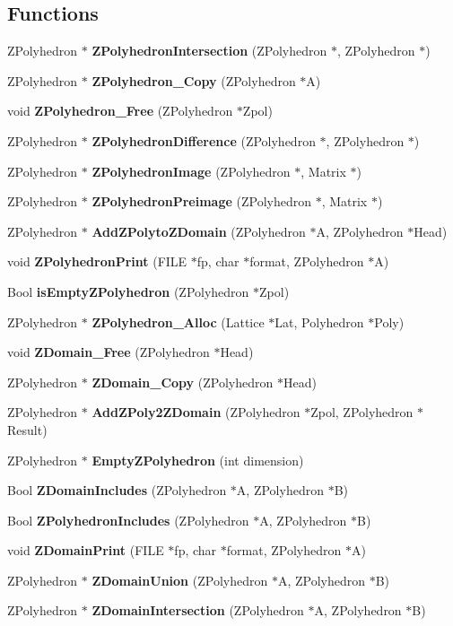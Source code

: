 \subsection*{Functions}
\begin{CompactItemize}
\item 
ZPolyhedron $\ast$ {\bf ZPolyhedron\-Intersection} (ZPolyhedron $\ast$, ZPolyhedron $\ast$)
\item 
ZPolyhedron $\ast$ {\bf ZPolyhedron\_\-Copy} (ZPolyhedron $\ast$A)
\item 
void {\bf ZPolyhedron\_\-Free} (ZPolyhedron $\ast$Zpol)
\item 
ZPolyhedron $\ast$ {\bf ZPolyhedron\-Difference} (ZPolyhedron $\ast$, ZPolyhedron $\ast$)
\item 
ZPolyhedron $\ast$ {\bf ZPolyhedron\-Image} (ZPolyhedron $\ast$, Matrix $\ast$)
\item 
ZPolyhedron $\ast$ {\bf ZPolyhedron\-Preimage} (ZPolyhedron $\ast$, Matrix $\ast$)
\item 
ZPolyhedron $\ast$ {\bf Add\-ZPolyto\-ZDomain} (ZPolyhedron $\ast$A, ZPolyhedron $\ast$Head)
\item 
void {\bf ZPolyhedron\-Print} (FILE $\ast$fp, char $\ast$format, ZPolyhedron $\ast$A)
\item 
Bool {\bf is\-Empty\-ZPolyhedron} (ZPolyhedron $\ast$Zpol)
\item 
ZPolyhedron $\ast$ {\bf ZPolyhedron\_\-Alloc} (Lattice $\ast$Lat, Polyhedron $\ast$Poly)
\item 
void {\bf ZDomain\_\-Free} (ZPolyhedron $\ast$Head)
\item 
ZPolyhedron $\ast$ {\bf ZDomain\_\-Copy} (ZPolyhedron $\ast$Head)
\item 
ZPolyhedron $\ast$ {\bf Add\-ZPoly2ZDomain} (ZPolyhedron $\ast$Zpol, ZPolyhedron $\ast$Result)
\item 
ZPolyhedron $\ast$ {\bf Empty\-ZPolyhedron} (int dimension)
\item 
Bool {\bf ZDomain\-Includes} (ZPolyhedron $\ast$A, ZPolyhedron $\ast$B)
\item 
Bool {\bf ZPolyhedron\-Includes} (ZPolyhedron $\ast$A, ZPolyhedron $\ast$B)
\item 
void {\bf ZDomain\-Print} (FILE $\ast$fp, char $\ast$format, ZPolyhedron $\ast$A)
\item 
ZPolyhedron $\ast$ {\bf ZDomain\-Union} (ZPolyhedron $\ast$A, ZPolyhedron $\ast$B)
\item 
ZPolyhedron $\ast$ {\bf ZDomain\-Intersection} (ZPolyhedron $\ast$A, ZPolyhedron $\ast$B)

\end{CompactItemize}
